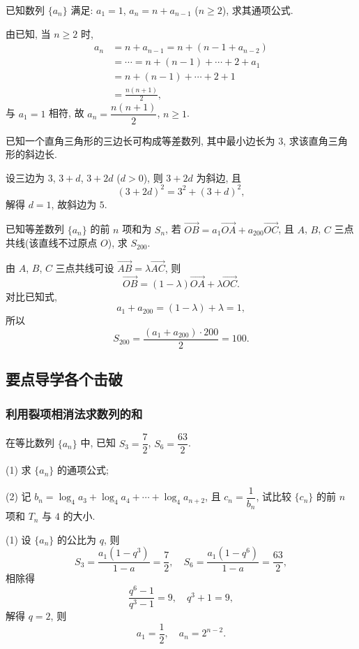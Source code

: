 \begin{exercise}
    已知数列 $\{a_n\}$ 满足: $a_1=1$, $a_n=n+a_{n-1}$ ($n\geqslant 2$), 求其通项公式.
\end{exercise}
\beginsolution
    由已知, 当 $n\geqslant 2$ 时,
    \[\begin{aligned}
        a_n
        &= n+ a_{n-1}= n+ (n-1+a_{n-2})\\
        &= \cdots = n+(n-1)+\cdots + 2+ a_1\\
        &= n+(n-1)+\cdots +2+1\\
        &= \frac{n(n+1)}2,
    \end{aligned}\]
    与 $a_1= 1$ 相符, 故 $a_n= \dfrac{n(n+1)}2$, $n\geqslant 1$.
\endsolution

\begin{exercise}
    已知一个直角三角形的三边长可构成等差数列, 其中最小边长为 $3$, 求该直角三角形的斜边长.
\end{exercise}
\beginsolution
    设三边为 $3$, $3+d$, $3+2d$ ($d>0$), 则 $3+2d$ 为斜边, 且
    \[(3+2d)^2= 3^2+ (3+d)^2,\]
    解得 $d=1$, 故斜边为 $5$.
\endsolution

\begin{exercise}
    已知等差数列 $\{a_n\}$ 的前 $n$ 项和为 $S_n$, 若 $\overrightarrow{OB} =a_1 \overrightarrow{OA} +a_{200}\overrightarrow{OC}$, 且 $A$, $B$, $C$ 三点共线(该直线不过原点 $O$), 求 $S_{200}$.
\end{exercise}
\beginsolution
    由 $A$, $B$, $C$ 三点共线可设 $\overrightarrow{AB}= \lambda\overrightarrow{AC}$, 则
    \[\overrightarrow{OB}= (1-\lambda)\overrightarrow{OA}
        + \lambda\overrightarrow{OC}.\]
    对比已知式,
    \[a_1+a_{200}= (1-\lambda)+ \lambda= 1,\]
    所以
    \[S_{200}= \frac{(a_1+ a_{200})\cdot 200}2= 100.\]
\endsolution

\subsection{要点导学\quad 各个击破}

\subsubsection{利用裂项相消法求数列的和}
\begin{example}
    在等比数列 $\{a_n\}$ 中, 已知 $S_3= \dfrac72$, $S_6= \dfrac{63}2$.
    
    (1) 求 $\{a_n\}$ 的通项公式;
    
    (2) 记 $b_n =\log_4 a_3 +\log_4 a_4 +\cdots+\log_4 a_{n+2}$, 且 $c_n =\dfrac1{b_n}$, 试比较 $\{c_n\}$ 的前 $n$ 项和 $T_n$ 与 $4$ 的大小.
\end{example}
\beginsolution
    (1) 设 $\{a_n\}$ 的公比为 $q$, 则
    \[S_3= \frac{a_1(1-q^3)}{1-a}= \frac72,\quad
    S_6= \frac{a_1(1-q^6)}{1-a}= \frac{63}2,\]
    相除得
    \[\frac{q^6- 1}{q^3-1}= 9,\quad q^3+1= 9,\]
    解得 $q=2$, 则 
    \[a_1= \frac12,\quad a_n= 2^{n-2}.\]

